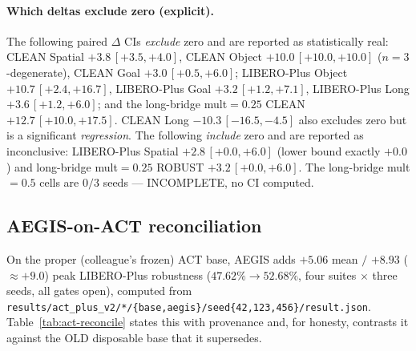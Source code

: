 \paragraph{Which deltas exclude zero (explicit).}
The following paired $\Delta$ CIs \emph{exclude} zero and are reported as
statistically real: CLEAN Spatial $+3.8\,[+3.5,+4.0]$, CLEAN Object
$+10.0\,[+10.0,+10.0]$ ($n=3$-degenerate), CLEAN Goal $+3.0\,[+0.5,+6.0]$;
LIBERO-Plus Object $+10.7\,[+2.4,+16.7]$, LIBERO-Plus Goal $+3.2\,[+1.2,+7.1]$,
LIBERO-Plus Long $+3.6\,[+1.2,+6.0]$; and the long-bridge mult$=0.25$ CLEAN
$+12.7\,[+10.0,+17.5]$. CLEAN Long $-10.3\,[-16.5,-4.5]$ also excludes zero but
is a significant \emph{regression}. The following \emph{include} zero and are
reported as inconclusive: LIBERO-Plus Spatial $+2.8\,[+0.0,+6.0]$ (lower bound
exactly $+0.0$) and long-bridge mult$=0.25$ ROBUST $+3.2\,[+0.0,+6.0]$. The
long-bridge mult$=0.5$ cells are $0/3$ seeds --- INCOMPLETE, no CI computed.

\subsection{AEGIS-on-ACT reconciliation}

On the proper (colleague's frozen) ACT base, AEGIS adds $+5.06$ mean $/$ $+8.93$
($\approx +9.0$) peak LIBERO-Plus robustness ($47.62\%\to52.68\%$, four suites
$\times$ three seeds, all gates open), computed from
\texttt{results/act\_plus\_v2/*/\{base,aegis\}/seed\{42,123,456\}/result.json}.
Table~\ref{tab:act-reconcile} states this with provenance and, for honesty,
contrasts it against the OLD disposable base that it supersedes.

